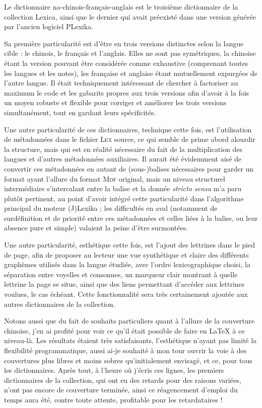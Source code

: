 Le dictionnaire na-chinois-français-anglais est le troisième dictionnaire de la collection Lexica, ainsi que le dernier qui avait préexisté dans une version générée par l’ancien logiciel PLexika.

Sa première particularité est d’être en trois versions distinctes selon la langue cible : le chinois, le français et l’anglais. Elles ne sont pas symétriques, la chinoise étant la version pouvant être considérée comme exhaustive (comprenant toutes les langues et les notes), les française et anglaise étant mutuellement expurgées de l’autre langue. Il était techniquement intéressant de chercher à factoriser au maximum le code et les gabarits propres aux trois versions afin d’avoir à la fois un moyen robuste et flexible pour corriger et améliorer les trois versions simultanément, tout en gardant leurs spécificités.

Une autre particularité de ces dictionnaires, technique cette fois, est l’utilisation de métadonnées dans le fichier \textsc{Lex} source, ce qui semble de prime abord alourdir la structure, mais qui est en réalité nécessaire du fait de la multiplication des langues et d’autres métadonnées auxiliaires. Il aurait été évidemment aisé de convertir ces métadonnées en autant de (sous-)balises nécessaires pour garder un format ayant l’allure du format \textsc{Mdf} original, mais un niveau structurel intermédiaire s’intercalant entre la balise et la donnée \emph{stricto sensu} m’a paru plutôt pertinent, au point d’avoir intégré cette particularité dans l’algorithme principal du moteur (J)Lexika ; les difficultés en aval (notamment de surdéfinition et de priorité entre ces métadonnées et celles liées à la balise, ou leur absence pure et simple) valaient la peine d’être surmontées.

Une autre particularité, esthétique cette fois, est l’ajout des lettrines dans le pied de page, afin de proposer au lecteur une vue synthétique et claire des différents graphèmes utilisés dans la langue étudiée, avec l’ordre lexicographique choisi, la séparation entre voyelles et consonnes, un marqueur clair montrant à quelle lettrine la page se situe, ainsi que des liens permettant d’accéder aux lettrines voulues, le cas échéant. Cette fonctionnalité sera très certainement ajoutée aux autres dictionnaires de la collection.

Notons aussi que du fait de souhaits particuliers quant à l’allure de la couverture chinoise, j’en ai profité pour voir ce qu’il était possible de faire en \LaTeX{} à ce niveau-là. Les résultats étaient très satisfaisants, l’esthétique n’ayant pas limité la flexibilité programmatique, aussi ai-je souhaité à mon tour ouvrir la voie à des couvertures plus libres et moins sobres qu’initialement envisagé, et ce, pour tous les dictionnaires. Après tout, à l’heure où j’écris ces lignes, les premiers dictionnaires de la collection, qui ont eu des retards pour des raisons variées, n’ont pas encore de couverture terminée, ainsi ce réagencement d’emploi du temps aura été, contre toute attente, profitable pour les retardataires !

